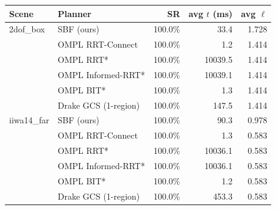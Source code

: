 \begin{tabular}{llrrr}
  \toprule
  Scene & Planner & SR & avg $t$ (ms) & avg $\ell$ \\
  \midrule
  2dof\_box & SBF (ours) & 100.0\% & 33.4 & 1.728 \\
   & OMPL RRT-Connect & 100.0\% & 1.2 & 1.414 \\
   & OMPL RRT* & 100.0\% & 10039.5 & 1.414 \\
   & OMPL Informed-RRT* & 100.0\% & 10039.1 & 1.414 \\
   & OMPL BIT* & 100.0\% & 1.3 & 1.414 \\
   & Drake GCS (1-region) & 100.0\% & 147.5 & 1.414 \\
  iiwa14\_far & SBF (ours) & 100.0\% & 90.3 & 0.978 \\
   & OMPL RRT-Connect & 100.0\% & 1.3 & 0.583 \\
   & OMPL RRT* & 100.0\% & 10036.1 & 0.583 \\
   & OMPL Informed-RRT* & 100.0\% & 10036.1 & 0.583 \\
   & OMPL BIT* & 100.0\% & 1.2 & 0.583 \\
   & Drake GCS (1-region) & 100.0\% & 453.3 & 0.583 \\
  \bottomrule
\end{tabular}
